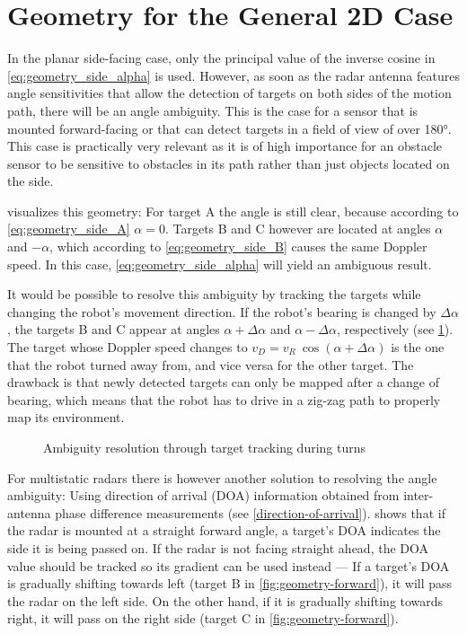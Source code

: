 \section{Geometry for the General 2D Case} \label{geometry-for-the-general-case}

In the planar side-facing case, only the principal value of the inverse cosine in \cref{eq:geometry_side_alpha} is used. However, as soon as the radar antenna features angle sensitivities that allow the detection of targets on both sides of the motion path, there will be an angle ambiguity. This is the case for a sensor that is mounted forward-facing or that can detect targets in a field of view of over 180°. This case is practically very relevant as it is of high importance for an obstacle sensor to be sensitive to obstacles in its path rather than just objects located on the side.

 visualizes this geometry: For target A the angle is still clear, because according to \cref{eq:geometry_side_A} $\alpha = 0$. Targets B and C however are located at angles $\alpha$ and $-\alpha$, which according to \cref{eq:geometry_side_B} causes the same Doppler speed. In this case, \cref{eq:geometry_side_alpha} will yield an ambiguous result.

It would be possible to resolve this ambiguity by tracking the targets while changing the robot's movement direction. If the robot's bearing is changed by $\Delta\alpha$, the targets B and C appear at angles $\alpha+\Delta\alpha$ and $\alpha-\Delta\alpha$, respectively (see \cref{fig:geometry-turn}). The target whose Doppler speed changes to $v_D = v_R~\cos(\alpha+\Delta\alpha)$ is the one that the robot turned away from, and vice versa for the other target. The drawback is that newly detected targets can only be mapped after a change of bearing, which means that the robot has to drive in a zig-zag path to properly map its environment.

\begin{figure}
    \centering
    \def\svgwidth{0.5\linewidth}
    
    \caption{Ambiguity resolution through target tracking during turns}
    \label{fig:geometry-turn}
\end{figure}

For multistatic radars there is however another solution to resolving the angle ambiguity: Using direction of arrival (DOA) information obtained from inter-antenna phase difference measurements (see \cref{direction-of-arrival}).  shows that if the radar is mounted at a straight forward angle, a target's DOA indicates the side it is being passed on. If the radar is not facing straight ahead, the DOA value should be tracked so its gradient can be used instead --- If a target's DOA is gradually shifting towards left (target B in \cref{fig:geometry-forward}), it will pass the radar on the left side. On the other hand, if it is gradually shifting towards right, it will pass on the right side (target C in \cref{fig:geometry-forward}).

